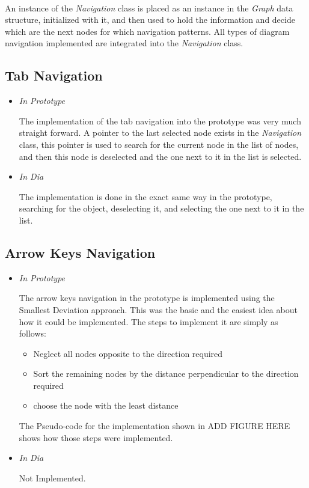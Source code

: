 \paragraph{}
An instance of the {\it Navigation} class is placed as an instance in the {\it Graph} data structure, initialized with it, and then used to hold the information and decide which are the next nodes for which navigation patterns. All types of diagram navigation implemented are integrated into the {\it Navigation} class.


\subsection{Tab Navigation}
\begin{itemize}
\item {\it In Prototype}
\par \noindent
The implementation of the tab navigation into the prototype was very much straight forward. A pointer to the last selected node exists in the {\it Navigation} class, this pointer is used to search for the current node in the list of nodes, and then this node is deselected and the one next to it in the list is selected.

\item {\it In Dia}
\par \noindent
The implementation is done in the exact same way in the prototype, searching for the object, deselecting it, and selecting the one next to it in the list.
\end{itemize}


\subsection{Arrow Keys Navigation}
\begin{itemize}
\item {\it In Prototype}
\par \noindent
The arrow keys navigation in the prototype is implemented using the Smallest Deviation approach. This was the basic and the easiest idea about how it could be implemented.
The steps to implement it are simply as follows:
\begin{itemize}
\item Neglect all nodes opposite to the direction required
\item Sort the remaining nodes by the distance perpendicular to the direction required
\item choose the node with the least distance
\end{itemize}
The Pseudo-code for the implementation shown in ADD FIGURE HERE shows how those steps were implemented.

\item {\it In Dia}
\par \noindent
Not Implemented.
\end{itemize}

